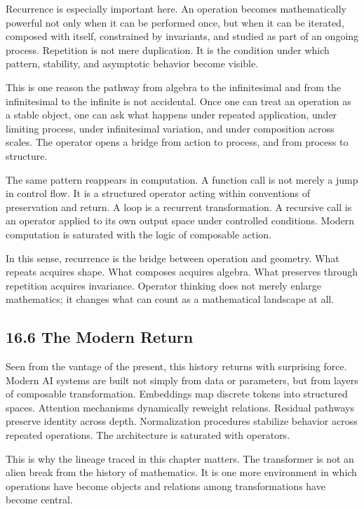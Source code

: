 Recurrence is especially important here. An operation becomes
mathematically powerful not only when it can be performed once, but when
it can be iterated, composed with itself, constrained by invariants, and
studied as part of an ongoing process. Repetition is not mere
duplication. It is the condition under which pattern, stability, and
asymptotic behavior become visible.

This is one reason the pathway from algebra to the infinitesimal and
from the infinitesimal to the infinite is not accidental. Once one can
treat an operation as a stable object, one can ask what happens under
repeated application, under limiting process, under infinitesimal
variation, and under composition across scales. The operator opens a
bridge from action to process, and from process to structure.

The same pattern reappears in computation. A function call is not merely
a jump in control flow. It is a structured operator acting within
conventions of preservation and return. A loop is a recurrent
transformation. A recursive call is an operator applied to its own
output space under controlled conditions. Modern computation is
saturated with the logic of composable action.

In this sense, recurrence is the bridge between operation and geometry.
What repeats acquires shape. What composes acquires algebra. What
preserves through repetition acquires invariance. Operator thinking does
not merely enlarge mathematics; it changes what can count as a
mathematical landscape at all.

\hypertarget{the-modern-return}{%
\subsection{16.6 The Modern Return}\label{the-modern-return}}

Seen from the vantage of the present, this history returns with
surprising force. Modern AI systems are built not simply from data or
parameters, but from layers of composable transformation. Embeddings map
discrete tokens into structured spaces. Attention mechanisms dynamically
reweight relations. Residual pathways preserve identity across depth.
Normalization procedures stabilize behavior across repeated operations.
The architecture is saturated with operators.

This is why the lineage traced in this chapter matters. The transformer
is not an alien break from the history of mathematics. It is one more
environment in which operations have become objects and relations among
transformations have become central.

